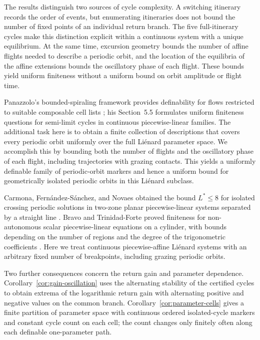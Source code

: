 \documentclass[11pt]{article}
\theoremstyle{remark}
\begin{document}
The results distinguish two sources of cycle complexity.  A switching
itinerary records the order of events, but enumerating itineraries does
not bound the number of fixed points of an individual return branch.
The five full-itinerary cycles make this distinction explicit within a
continuous system with a unique equilibrium.  At the same time, excursion
geometry bounds the number of affine flights needed to describe a periodic
orbit, and the location of the equilibria of the affine extensions bounds
the oscillatory phase of each flight.  These bounds yield uniform
finiteness without a uniform bound on orbit amplitude or flight time.

Panazzolo's bounded-spiraling framework provides definability for flows
restricted to suitable composable cell lists
\cite[Theorem~1.2]{panazzolo}; his Section~5.5 formulates uniform finiteness
questions for semi-limit cycles in continuous piecewise-linear families.
The additional task here is to obtain a finite collection of descriptions
that covers every periodic orbit uniformly over the full Li\'enard
parameter space.  We accomplish this by bounding both the number of
flights and the oscillatory phase of each flight, including trajectories
with grazing contacts.  This yields a uniformly definable family of
periodic-orbit markers and hence a uniform bound for geometrically isolated
periodic orbits in this Li\'enard subclass.

Carmona, Fern\'andez-S\'anchez, and Novaes obtained the bound \(L^*\le8\)
for isolated crossing periodic solutions in two-zone planar piecewise-linear
systems separated by a straight line \cite{carmona}.  Bravo and
Trinidad-Forte proved finiteness for non-autonomous scalar piecewise-linear
equations on a cylinder, with bounds depending on the number of regions
and the degree of the trigonometric coefficients \cite{bravo}.  Here we
treat continuous piecewise-affine Li\'enard systems with an arbitrary
fixed number of breakpoints, including grazing periodic orbits.

Two further consequences concern the return gain and parameter dependence.
Corollary~\ref{cor:gain-oscillation} uses the alternating stability of the
certified cycles to obtain extrema of the logarithmic return gain with
alternating positive and negative values on the common branch.
Corollary~\ref{cor:parameter-cells} gives a finite partition of parameter
space with continuous ordered isolated-cycle markers and constant cycle
count on each cell; the count changes only finitely often along each
definable one-parameter path.
\end{document}
